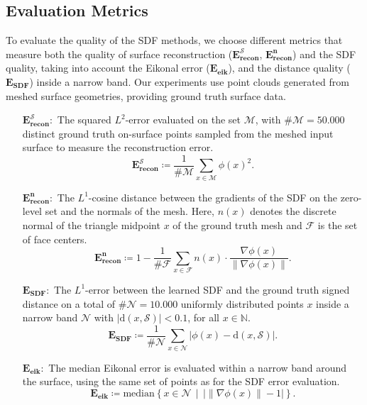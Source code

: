 \documentclass[12pt,openany]{book}
\theoremstyle{plainnormal}
\theoremstyle{remark}
\begin{document}
\subsection{Evaluation Metrics}
To evaluate the quality of the SDF methods, we choose different metrics that measure both the quality of surface reconstruction (\(\mathbf{E_{recon}^{\mathcal{S}}}\), $\mathbf{E_{recon}^n}$) and the SDF quality, taking into account the Eikonal error ($\mathbf{E_{eik}}$), and the distance quality ($\mathbf{E_{SDF}}$) inside a narrow band. Our experiments use point clouds generated from meshed surface geometries, providing ground truth surface data.
\begin{enumerate}[align=left]
\item[\(\mathbf{E_{recon}^{\mathcal{S}}}:\)]  The squared $L^2$-error evaluated on the set $\mathcal M$, with $\#\mathcal M = 50.000$ distinct ground truth on-surface points sampled from the meshed input surface to measure the reconstruction error.
 $$\mathbf{E_{recon}^{\mathcal{S}}}\coloneqq\frac{1}{\# \mathcal{M} }\sum_{x \in \mathcal{M}} \phi(x)^2.$$
\item[$\mathbf{E_{recon}^n:}$] The $L^1$-cosine distance between the gradients of the SDF on the zero-level set and the normals of the mesh. Here, $n(x)$ denotes the discrete normal of the triangle midpoint $x$ of the ground truth mesh and $\mathcal{F}$ is the set of face centers. 
$$\mathbf{E_{recon}^n} \coloneqq1 - \frac{1}{\#\mathcal{F}} \sum_{x\in \mathcal{F}} n(x)\cdot\frac{\nabla  \phi(x)}{\|\nabla \phi(x)\|}. $$
\item[$\mathbf{E_{SDF}:}$] The $L^1$-error between the learned SDF and the ground truth signed distance on a total of $\#\mathcal N = 10.000$ uniformly distributed points $x$ inside a narrow band $\mathcal{N}$ with $|\mathrm{d}(x, \mathcal{S})| < 0.1$, for all $ x\in \mathbb N$.
$$\mathbf{E_{SDF}} \coloneqq \frac{1}{\#\mathcal{N}}\sum_{x\in \mathcal{N}}|\phi(x) - \mathrm{d}(x, \mathcal{S})|.$$%
\item[\(\mathbf{E_{{eik}}:}\)] The median Eikonal error is evaluated within a narrow band around the surface, using the same set of points as for the SDF error evaluation.
 $$\mathbf{E_{eik}} \coloneqq \mathrm{median} \left\{x\in \mathcal{N} \, \mid\,  \big|\|\nabla\phi(x)\| - 1\big|\right\}. $$
\end{enumerate}
\end{document}
